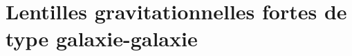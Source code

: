 

\section{Lentilles gravitationnelles fortes de type galaxie-galaxie}\label{sec:lentilles gravitationnelles}


